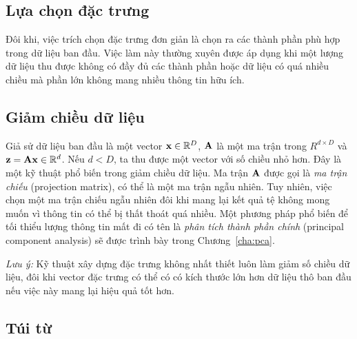 \subsection{Lựa chọn đặc trưng}
Đôi khi, việc trích chọn đặc trưng đơn giản là chọn ra các thành phần phù hợp trong dữ liệu ban đầu. Việc làm này thường xuyên được áp dụng khi một lượng dữ liệu thu được không có đầy đủ các thành phần hoặc dữ liệu có quá nhiều chiều mà phần lớn không mang nhiều thông tin hữu ích.

\subsection{Giảm chiều dữ liệu}
Giả sử dữ liệu ban đầu là một vector $\mathbf{x} \in \mathbb{R}^D$, $\mathbf{A}$ là một ma trận trong
$R^{d\times D}$ và $\mathbf{z} = \mathbf{A}\mathbf{x}\in\mathbb{R}^d$. Nếu $d < D$, ta thu được một vector
với số chiều nhỏ hơn. Đây là một kỹ thuật phổ biến trong giảm chiều dữ liệu. Ma
trận $\mathbf{A}$ được gọi là \textit{ma trận chiếu} (projection matrix), có thể là một ma trận ngẫu nhiên.
Tuy nhiên, việc chọn một ma trận chiếu ngẫu nhiên đôi khi mang lại kết quả tệ
không mong muốn vì thông tin có thể bị thất thoát quá nhiều. Một phương pháp phổ
biến để tối thiểu lượng thông tin mất đi có tên là \textit{phân tích thành phần
chính} ({principal component analysis}) sẽ được trình bày trong
Chương~\ref{cha:pca}.

\textit{Lưu ý:} {Kỹ thuật xây dựng đặc trưng không nhất thiết luôn làm giảm số
chiều dữ liệu, đôi khi vector đặc trưng có thể có có kích thước lớn hơn dữ liệu
thô ban đầu nếu việc này mang lại hiệu quả tốt hơn.}



\subsection{Túi từ}

